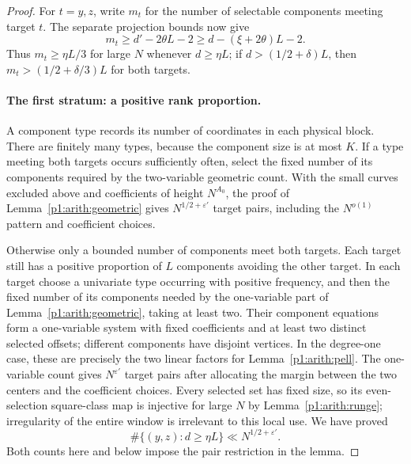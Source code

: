 \begin{proof}
For $t=y,z$, write $m_t$ for the number of selectable components
meeting target $t$. The separate projection bounds now give
\begin{equation*}
 m_t\geq d'-2\theta L-2
      \geq d-(\xi+2\theta)L-2.
\end{equation*}
Thus $m_t\geq\eta L/3$ for large $N$ whenever $d\geq\eta L$;
if $d>(1/2+\delta)L$, then
$m_t>(1/2+\delta/3)L$ for both targets.

\paragraph{The first stratum: a positive rank proportion.}
A component type records its number of coordinates in each physical
block. There are finitely many types, because the component size is at
most $K$. If a type meeting both targets occurs sufficiently often,
select the fixed number of its components required by the two-variable
geometric count. With the small curves excluded above and coefficients
of height $N^{A_0}$, the proof of Lemma~\ref{p1:arith:geometric}
gives $N^{1/2+\varepsilon'}$ target pairs, including the
$N^{o(1)}$ pattern and coefficient choices.

Otherwise only a bounded number of components meet both targets.
Each target still has a positive proportion of $L$ components avoiding
the other target. In each target choose a univariate type occurring with
positive frequency, and then the fixed number of its components needed
by the one-variable part of Lemma~\ref{p1:arith:geometric}, taking
at least two. Their component equations form a one-variable system
with fixed coefficients and at least two distinct selected offsets;
different components have disjoint vertices. In the degree-one case,
these are precisely the two linear factors for
Lemma~\ref{p1:arith:pell}. The one-variable count gives
$N^{\varepsilon'}$ target pairs after allocating the margin between
the two centers and the coefficient choices. Every selected set has fixed size, so its even-selection
square-class map is injective for large $N$ by
Lemma~\ref{p1:arith:runge}; irregularity of the entire window is
irrelevant to this local use. We have proved
\[
 \#\{(y,z):d\geq\eta L\}\ll N^{1/2+\varepsilon'}.
\]
Both counts here and below impose the pair restriction in the lemma.


\end{proof}
